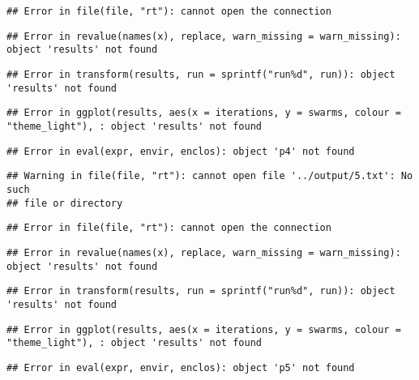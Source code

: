 \documentclass[12pt,a4paper]{article}
\begin{document}
\begin{verbatim}
## Error in file(file, "rt"): cannot open the connection
\end{verbatim}

\begin{verbatim}
## Error in revalue(names(x), replace, warn_missing = warn_missing): object 'results' not found
\end{verbatim}

\begin{verbatim}
## Error in transform(results, run = sprintf("run%d", run)): object 'results' not found
\end{verbatim}

\begin{verbatim}
## Error in ggplot(results, aes(x = iterations, y = swarms, colour = "theme_light"), : object 'results' not found
\end{verbatim}

\begin{verbatim}
## Error in eval(expr, envir, enclos): object 'p4' not found
\end{verbatim}

\begin{verbatim}
## Warning in file(file, "rt"): cannot open file '../output/5.txt': No such
## file or directory
\end{verbatim}

\begin{verbatim}
## Error in file(file, "rt"): cannot open the connection
\end{verbatim}

\begin{verbatim}
## Error in revalue(names(x), replace, warn_missing = warn_missing): object 'results' not found
\end{verbatim}

\begin{verbatim}
## Error in transform(results, run = sprintf("run%d", run)): object 'results' not found
\end{verbatim}

\begin{verbatim}
## Error in ggplot(results, aes(x = iterations, y = swarms, colour = "theme_light"), : object 'results' not found
\end{verbatim}

\begin{verbatim}
## Error in eval(expr, envir, enclos): object 'p5' not found
\end{verbatim}
\end{document}
